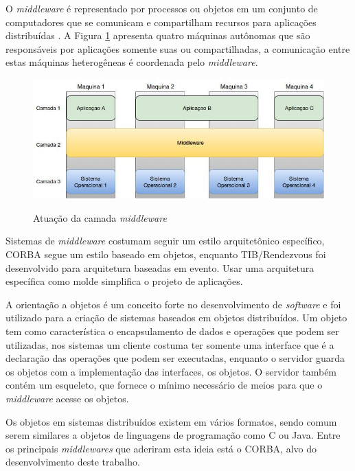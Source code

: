 	O \textit{middleware} é representado por processos ou objetos em um conjunto de computadores que se comunicam e compartilham recursos para aplicações distribuídas \cite{Coulouris-2012}. A Figura \ref{fig:Tanenbaum-middleware} apresenta quatro máquinas autônomas que são responsáveis por aplicações somente suas ou compartilhadas, a comunicação entre estas máquinas heterogêneas é coordenada pelo \textit{middleware}. 
		
	\begin{figure}[htb]
		\caption{Atuação da camada \textit{middleware}}
		{\parbox{6cm}{
				\includegraphics[width=14cm]{images/middleware.jpeg}
				\label{fig:Tanenbaum-middleware}
		}}
	\end{figure}

	Sistemas de \textit{middleware} costumam seguir um estilo arquitetônico específico, CORBA segue um estilo baseado em objetos, enquanto TIB/Rendezvous foi desenvolvido para arquitetura baseadas em evento. Usar uma arquitetura específica como molde simplifica o projeto de aplicações.
	
	A orientação a objetos é um conceito forte no desenvolvimento de \textit{software} e foi utilizado para a criação de sistemas baseados em objetos distribuídos. Um objeto tem como característica o encapsulamento de dados e operações que podem ser utilizadas, nos sistemas um cliente costuma ter somente uma interface que é a declaração das operações que podem ser executadas, enquanto o servidor guarda os objetos com a implementação das interfaces, os objetos. O servidor também contém um esqueleto, que fornece o mínimo necessário de meios para que o \textit{middleware} acesse os objetos.
	
	Os objetos em sistemas distribuídos existem em vários formatos, sendo comum serem similares a objetos de linguagens de programação como C ou Java. Entre os principais \textit{middlewares} que aderiram esta ideia está o CORBA, alvo do desenvolvimento deste trabalho.
	
